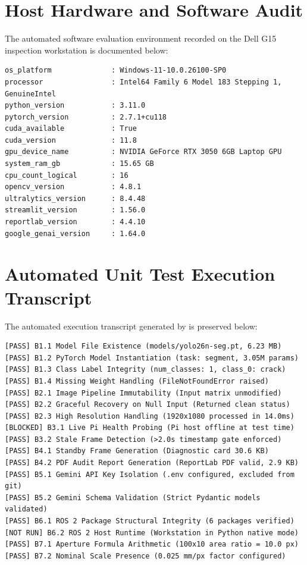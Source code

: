 \documentclass[12pt,a4paper,oneside]{report}
\begin{document}
\appendix
\chapter{Host Hardware and Software Audit}
\label{app:env}
The automated software evaluation environment recorded on the Dell G15 inspection workstation is documented below:
\begin{lstlisting}
os_platform              : Windows-11-10.0.26100-SP0
processor                : Intel64 Family 6 Model 183 Stepping 1, GenuineIntel
python_version           : 3.11.0
pytorch_version          : 2.7.1+cu118
cuda_available           : True
cuda_version             : 11.8
gpu_device_name          : NVIDIA GeForce RTX 3050 6GB Laptop GPU
system_ram_gb            : 15.65 GB
cpu_count_logical        : 16
opencv_version           : 4.8.1
ultralytics_version      : 8.4.48
streamlit_version        : 1.56.0
reportlab_version        : 4.4.10
google_genai_version     : 1.64.0
\end{lstlisting}

\chapter{Automated Unit Test Execution Transcript}
\label{app:testlog}
The automated execution transcript generated by  is preserved below:
\begin{lstlisting}
[PASS] B1.1 Model File Existence (models/yolo26n-seg.pt, 6.23 MB)
[PASS] B1.2 PyTorch Model Instantiation (task: segment, 3.05M params)
[PASS] B1.3 Class Label Integrity (num_classes: 1, class_0: crack)
[PASS] B1.4 Missing Weight Handling (FileNotFoundError raised)
[PASS] B2.1 Image Pipeline Immutability (Input matrix unmodified)
[PASS] B2.2 Graceful Recovery on Null Input (Returned clean status)
[PASS] B2.3 High Resolution Handling (1920x1080 processed in 14.0ms)
[BLOCKED] B3.1 Live Pi Health Probing (Pi host offline at test time)
[PASS] B3.2 Stale Frame Detection (>2.0s timestamp gate enforced)
[PASS] B4.1 Standby Frame Generation (Diagnostic card 30.6 KB)
[PASS] B4.2 PDF Audit Report Generation (ReportLab PDF valid, 2.9 KB)
[PASS] B5.1 Gemini API Key Isolation (.env configured, excluded from git)
[PASS] B5.2 Gemini Schema Validation (Strict Pydantic models validated)
[PASS] B6.1 ROS 2 Package Structural Integrity (6 packages verified)
[NOT RUN] B6.2 ROS 2 Host Runtime (Workstation in Python native mode)
[PASS] B7.1 Aperture Formula Arithmetic (100x10 area ratio = 10.0 px)
[PASS] B7.2 Nominal Scale Presence (0.025 mm/px factor configured)
\end{lstlisting}
\end{document}
